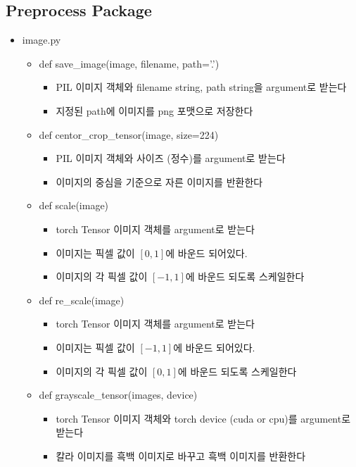 \subsection*{Preprocess Package}
\begin{itemize}
	\item image.py
	\begin{itemize}
		\item def save\_image(image, filename, path='.')
		\begin{itemize}
			\item PIL 이미지 객체와 filename string, path string을 argument로 받는다
			\item 지정된 path에 이미지를 png 포맷으로 저장한다
		\end{itemize}
		\item def centor\_crop\_tensor(image, size=224)
		\begin{itemize}
			\item PIL 이미지 객체와 사이즈 (정수)를 argument로 받는다
			\item 이미지의 중심을 기준으로 자른 이미지를 반환한다
		\end{itemize}
		\item def scale(image)
		\begin{itemize}
			\item torch Tensor 이미지 객체를 argument로 받는다
			\item 이미지는 픽셀 값이 $[0, 1]$에 바운드 되어있다.
			\item 이미지의 각 픽셀 값이 $[-1, 1]$에 바운드 되도록 스케일한다
		\end{itemize}
		\item def re\_scale(image)
		\begin{itemize}
			\item torch Tensor 이미지 객체를 argument로 받는다
			\item 이미지는 픽셀 값이 $[-1, 1]$에 바운드 되어있다.
			\item 이미지의 각 픽셀 값이 $[0, 1]$에 바운드 되도록 스케일한다
		\end{itemize}
		\item def grayscale\_tensor(images, device)
		\begin{itemize}
			\item torch Tensor 이미지 객체와 torch device (cuda or cpu)를 argument로 받는다
			\item 칼라 이미지를 흑백 이미지로 바꾸고 흑백 이미지를 반환한다
		\end{itemize}
	\end{itemize}

\end{itemize}
